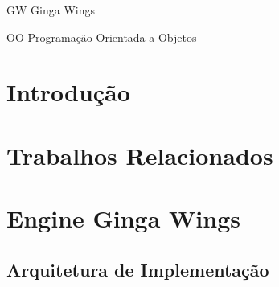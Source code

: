 \documentclass[
	12pt,				%
	openright,			%
	oneside,			%
	a4paper,			%
	brazil,				%
	]{abntex2}
\newcommand{\listofquadrosname}{Lista de quadros}
\renewcommand{\lstlistingname}{Código}
\renewcommand{\lstlistlistingname}{Lista de códigos}
\let\oldlstlistoflistings\lstlistoflistings
\renewcommand{\lstlistoflistings}{%
   \begingroup%
   \let\oldnumberline\numberline%
   \renewcommand{\numberline}{\lstlistingname\space\oldnumberline}%
   \oldlstlistoflistings%
   \endgroup}
\begin{document}
\frenchspacing 






\begin{siglas}
  \item[GW] Ginga Wings
  \item[OO] Programação Orientada a Objetos
\end{siglas}

\tableofcontents*
\cleardoublepage



\textual

\chapter{Introdução}

\chapter{Trabalhos Relacionados}

\chapter{Engine Ginga Wings}

\section{Arquitetura de Implementação}
\end{document}
